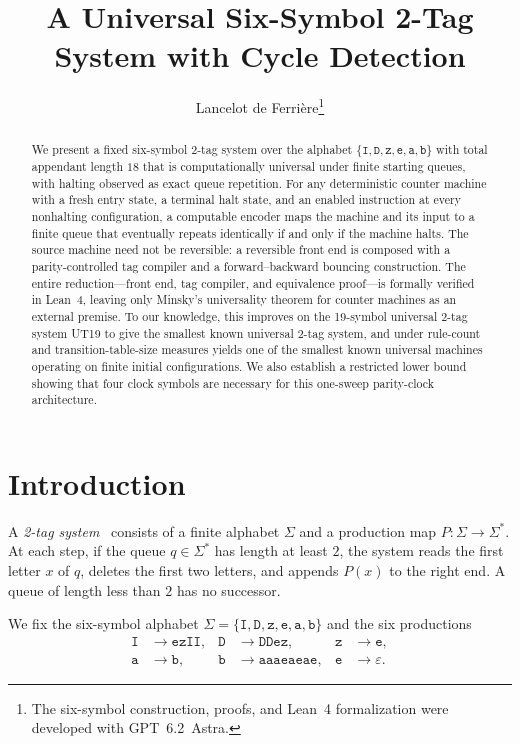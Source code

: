 \documentclass{article}
\title{A Universal Six-Symbol 2-Tag System with Cycle Detection}
\author{Lancelot de Ferri\`ere\thanks{The six-symbol construction, proofs, and Lean~4 formalization were developed with GPT~6.2~Astra.}}
\date{}
\theoremstyle{definition}
\theoremstyle{remark}
\newcommand{\ttw}[1]{\texttt{#1}}
\begin{document}
\maketitle

\begin{abstract}
We present a fixed six-symbol 2-tag system over the alphabet $\{\ttw{I},\ttw{D},\ttw{z},\ttw{e},\ttw{a},\ttw{b}\}$ with total appendant length $18$ that is computationally universal under finite starting queues, with halting observed as exact queue repetition.
For any deterministic counter machine with a fresh entry state, a terminal halt state, and an enabled instruction at every nonhalting configuration, a computable encoder maps the machine and its input to a finite queue that eventually repeats identically if and only if the machine halts.
The source machine need not be reversible: a reversible front end is composed with a parity-controlled tag compiler and a forward--backward bouncing construction.
The entire reduction---front end, tag compiler, and equivalence proof---is formally verified in Lean~4, leaving only Minsky's universality theorem for counter machines as an external premise.
To our knowledge, this improves on the 19-symbol universal 2-tag system UT19 to give the smallest known universal 2-tag system, and under rule-count and transition-table-size measures yields one of the smallest known universal machines operating on finite initial configurations.
We also establish a restricted lower bound showing that four clock symbols are necessary for this one-sweep parity-clock architecture.
\end{abstract}

\section{Introduction}

A \emph{2-tag system}~\cite{Post1943} consists of a finite alphabet $\Sigma$ and a production map $P:\Sigma \to \Sigma^*$.
At each step, if the queue $q \in \Sigma^*$ has length at least $2$, the system reads the first letter $x$ of $q$, deletes the first two letters, and appends $P(x)$ to the right end.
A queue of length less than $2$ has no successor.

We fix the six-symbol alphabet $\Sigma = \{\ttw{I},\ttw{D},\ttw{z},\ttw{e},\ttw{a},\ttw{b}\}$ and the six productions
\begin{equation}\label{eq:productions}
\begin{aligned}
\ttw{I} &\to \ttw{ezII}, & \ttw{D} &\to \ttw{DDez}, & \ttw{z} &\to \ttw{e}, \\
\ttw{a} &\to \ttw{b},    & \ttw{b} &\to \ttw{aaaeaeae}, & \ttw{e} &\to \varepsilon.
\end{aligned}
\end{equation}
\end{document}
